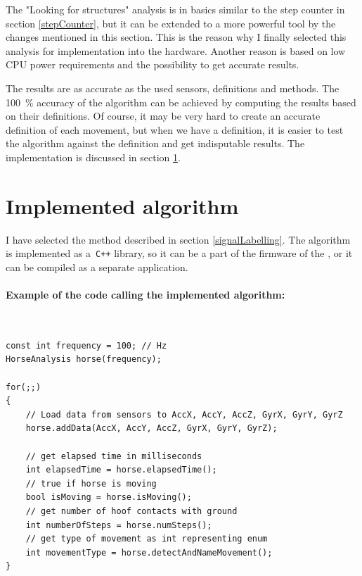 The "Looking for structures" analysis is in basics similar to the step counter in section \ref{stepCounter}, but it can be extended to a more powerful tool by the changes mentioned in this section. This is the reason why I finally selected this analysis for implementation into the  hardware. Another reason is based on low \ac{CPU} power requirements and the possibility to get accurate results.

The results are as accurate as the used sensors, definitions and methods. The \SI{100}{\%} accuracy of the algorithm can be achieved by computing the results based on their definitions. Of course, it may be very hard to create an accurate definition of each movement, but when we have a definition, it is easier to test the algorithm against the definition and get indisputable results. The implementation is discussed in section \ref{implementedAnalysis}.

\section{Implemented algorithm}
\label{implementedAnalysis}
I have selected the method described in section \ref{signalLabelling}. The algorithm is implemented as a~\texttt{C++} library, so it can be a part of the firmware of the , or it can be compiled as a separate application.

\paragraph{Example of the code calling the implemented algorithm:} \quad\\
\Cpp
\begin{lstlisting}
const int frequency = 100; // Hz
HorseAnalysis horse(frequency);

for(;;)
{
	// Load data from sensors to AccX, AccY, AccZ, GyrX, GyrY, GyrZ
	horse.addData(AccX, AccY, AccZ, GyrX, GyrY, GyrZ);
	
	// get elapsed time in milliseconds
	int elapsedTime = horse.elapsedTime();
	// true if horse is moving
	bool isMoving = horse.isMoving();
	// get number of hoof contacts with ground
	int numberOfSteps = horse.numSteps();
	// get type of movement as int representing enum
	int movementType = horse.detectAndNameMovement();
}
\end{lstlisting}

